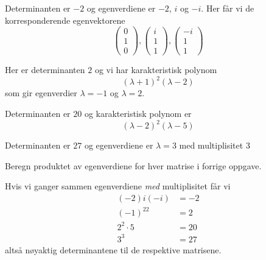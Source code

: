 \begin{losning}
	\begin{punkt}
		Determinanten er $-2$ og egenverdiene er $-2$, $i$ og $-i$. Her får vi de korresponderende egenvektorene
		\begin{equation*}
			\begin{pmatrix}
				0 \\ 1 \\ 0
			\end{pmatrix}
			,
			\begin{pmatrix}
				i \\ 1 \\ 1
			\end{pmatrix}
			,
			\begin{pmatrix}
				-i \\ 1 \\ 1
			\end{pmatrix}
		\end{equation*}
	\end{punkt}
	\begin{punkt}
		Her er determinanten $2$ og vi har karakteristisk polynom
		\begin{equation*}
			(\lambda + 1)^2(\lambda - 2)
		\end{equation*}
		som gir egenverdier $\lambda  = -1$ og $\lambda = 2$.
		
	\end{punkt}

	\begin{punkt}
		Determinanten er $20$ og karakteristisk polynom er 
		\begin{equation*}
			(\lambda - 2)^2(\lambda - 5)
		\end{equation*}
	\end{punkt}

	\begin{punkt}
		Determinanten er $27$ og egenverdiene er $\lambda = 3$ med multiplisitet 3
	\end{punkt}

\end{losning}

\begin{oppgave}
Beregn produktet av egenverdiene for hver matrise i forrige oppgave.
\end{oppgave}

\begin{losning}
	Hvis vi ganger sammen egenverdiene \emph{med} multiplisitet får vi
	\begin{align*}
		(-2)i(-i) &= -2 \\
		(-1)^22 &= 2 \\
		2^2\cdot 5 &= 20 \\
		3^3 & = 27
	\end{align*}
	altså nøyaktig determinantene til de respektive matrisene.
\end{losning}

